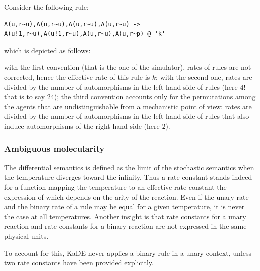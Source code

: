 \documentclass[11pt]{book}
\def\KaDE{\textsf{KaDE}}
\begin{document}
  Consider the following rule:
    \begin{lstlisting}[language=kappa]
A(u,r~u),A(u,r~u),A(u,r~u),A(u,r~u) -> A(u!1,r~u),A(u!1,r~u),A(u,r~u),A(u,r~p) @ 'k'
    \end{lstlisting}
which is depicted as follows:
\begin{center}
\end{center}

  with the first convention (that is the one of the simulator), rates of rules are not corrected, hence the effective rate of this rule is $k$;
  with the second one, rates are divided by the number of automorphisms in the left hand side of rules (here $4!$ that is to say $24$); the third convention accounts only for the permutations among the agents that are undistinguishable from a mechanistic point of view: rates are divided by the number of automorphisms in the left hand side of rules that also induce automorphisms of the right hand side  (here $2$).

  \subsubsection{Ambiguous molecularity}

The differential semantics is defined as the limit of the stochastic semantics when the temperature diverges toward the infinity. Thus a rate constant stands indeed for a function mapping the temperature to an effective rate constant the expression of which depends on the arity of the reaction. Even if the unary rate and the binary rate of a rule may be equal for a given temperature, it is never the case at all temperatures. Another insight is that rate constants for a unary reaction and rate constants for a binary reaction are not expressed in the same physical units.

To account for this, {\KaDE} never applies a binary rule in a
  unary context, unless two rate constants have been provided explicitly.
\end{document}
